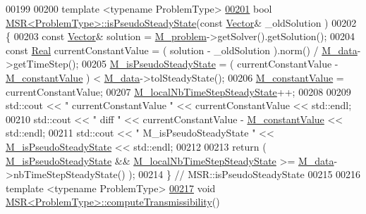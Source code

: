 \begin{DoxyCode}
00199 
00200 \textcolor{keyword}{template} <\textcolor{keyword}{typename} ProblemType>
\hypertarget{MultipleSubRegions_8hpp_source.tex_l00201}{}\hyperlink{classFVCode3D_1_1MSR_ae05006ec34d2e773279b4a3028e08d21}{00201} \textcolor{keywordtype}{bool} \hyperlink{classFVCode3D_1_1MSR_ae05006ec34d2e773279b4a3028e08d21}{MSR<ProblemType>::isPseudoSteadyState}(\textcolor{keyword}{const} 
      \hyperlink{namespaceFVCode3D_a16ccf345652402bccd1a5d2e6782526c}{Vector}& \_oldSolution )
00202 \{
00203     \textcolor{keyword}{const} \hyperlink{namespaceFVCode3D_a16ccf345652402bccd1a5d2e6782526c}{Vector}& solution = \hyperlink{classFVCode3D_1_1MSR_a531760a5415f63b7be6087ab117031e5}{M\_problem}->getSolver().getSolution();
00204     \textcolor{keyword}{const} \hyperlink{namespaceFVCode3D_a40c1f5588a248569d80aa5f867080e83}{Real} currentConstantValue = ( solution - \_oldSolution ).norm() / 
      \hyperlink{classFVCode3D_1_1MSR_a03e013e5191655455e66563e815f262b}{M\_data}->getTimeStep();
00205     \hyperlink{classFVCode3D_1_1MSR_aa4276f60467226b5aae9e12c024701f6}{M\_isPseudoSteadyState} = ( currentConstantValue - 
      \hyperlink{classFVCode3D_1_1MSR_ae1152dcd118f020c5cd9fefe4eafd5e4}{M\_constantValue} ) < \hyperlink{classFVCode3D_1_1MSR_a03e013e5191655455e66563e815f262b}{M\_data}->tolSteadyState();
00206     \hyperlink{classFVCode3D_1_1MSR_ae1152dcd118f020c5cd9fefe4eafd5e4}{M\_constantValue} = currentConstantValue;
00207     \hyperlink{classFVCode3D_1_1MSR_a481d90b7ea3b6d1f3f818f811e58a9a3}{M\_localNbTimeStepSteadyState}++;
00208 
00209     std::cout << \textcolor{stringliteral}{" currentConstantValue "} << currentConstantValue << std::endl;
00210     std::cout << \textcolor{stringliteral}{" diff "} << currentConstantValue - \hyperlink{classFVCode3D_1_1MSR_ae1152dcd118f020c5cd9fefe4eafd5e4}{M\_constantValue} << std::endl;
00211     std::cout << \textcolor{stringliteral}{" M\_isPseudoSteadyState "} << \hyperlink{classFVCode3D_1_1MSR_aa4276f60467226b5aae9e12c024701f6}{M\_isPseudoSteadyState} << std::endl;
00212 
00213     \textcolor{keywordflow}{return} ( \hyperlink{classFVCode3D_1_1MSR_aa4276f60467226b5aae9e12c024701f6}{M\_isPseudoSteadyState} && 
      \hyperlink{classFVCode3D_1_1MSR_a481d90b7ea3b6d1f3f818f811e58a9a3}{M\_localNbTimeStepSteadyState} >= \hyperlink{classFVCode3D_1_1MSR_a03e013e5191655455e66563e815f262b}{M\_data}->nbTimeStepSteadyState() );
00214 \} \textcolor{comment}{// MSR::isPseudoSteadyState}
00215 
00216 \textcolor{keyword}{template} <\textcolor{keyword}{typename} ProblemType>
\hypertarget{MultipleSubRegions_8hpp_source.tex_l00217}{}\hyperlink{classFVCode3D_1_1MSR_a86a998e349b36dbbef9300b15653afc2}{00217} \textcolor{keywordtype}{void} \hyperlink{classFVCode3D_1_1MSR_a86a998e349b36dbbef9300b15653afc2}{MSR<ProblemType>::computeTransmissibility}()

\end{DoxyCode}
